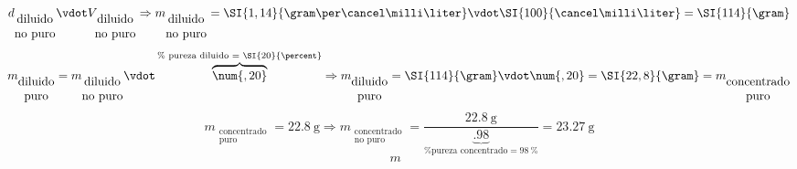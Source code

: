 \begin{frame}
\begin{overprint}
$$						d_{
							\begin{matrix}
								\text{diluido}\\
								\text{no puro}
							\end{matrix}
						}
					\vdot
						V_{
							\begin{matrix}
								\text{diluido}\\
								\text{no puro}
							\end{matrix}
						}
					\Rightarrow
					m_{
						\begin{matrix}
							\text{diluido}\\
							\text{no puro}
						\end{matrix}
					}
					= \SI{1,14}{\gram\per\cancel\milli\liter}\vdot\SI{100}{\cancel\milli\liter} = \SI{114}{\gram}
			$$
		\onslide<5>
			$$
				m_{
					\begin{matrix}
						\text{diluido}\\
						\text{puro}
					\end{matrix}
				}
				=
					m_{
						\begin{matrix}
							\text{diluido}\\
							\text{no puro}
						\end{matrix}
					}
					\vdot
					\overbrace{\num{,20}}^{\text{\% pureza diluido = \SI{20}{\percent}}}
				\Rightarrow
				m_{
					\begin{matrix}
						\text{diluido}\\
						\text{puro}
					\end{matrix}
				}
				=
					\SI{114}{\gram}
					\vdot
					\num{,20}
				=
					\SI{22,8}{\gram}
				=
				m_{
					\begin{matrix}
						\text{concentrado}\\
						\text{puro}
					\end{matrix}
				}
			$$
		\onslide<6>
			$$
				m_{
					\begin{matrix}
						\text{concentrado}\\
						\text{puro}
					\end{matrix}
				}
				=
				\SI{22,8}{\gram}
				\Rightarrow
				m_{
					\begin{matrix}
						\text{concentrado}\\
						\text{no puro}
					\end{matrix}
				}
				=
					\frac{\SI{22,8}{\gram}}{\underbrace{\num{,98}}_{\text{\% pureza concentrado} = \SI{98}{\percent}}}
				=
					\SI{23,27}{\gram}
			$$
		\onslide<7->
			$$
				m_{
					\begin{matrix}

\end{matrix}}$$
\end{overprint}
\end{frame}
